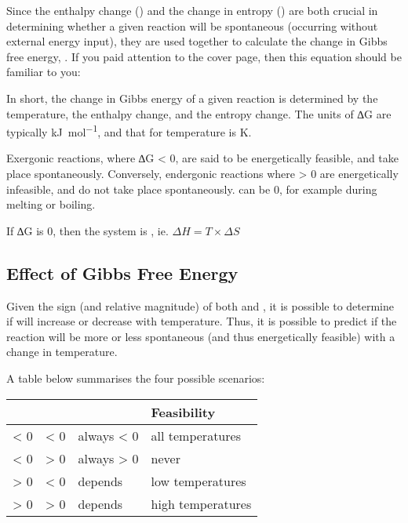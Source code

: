 		Since the enthalpy change (\enth{}) and the change in entropy (\entr{}) are both crucial in determining whether a given reaction will
		be spontaneous (occurring without external energy input), they are used together to calculate the change in Gibbs free energy, \gibb{}.
		If you paid attention to the cover page, then this equation should be familiar to you:

		\eqndiagram{
			\[ \Delta G = \Delta H - T\times \Delta S \]
		}

		In short, the change in Gibbs energy of a given reaction is determined by the temperature, the enthalpy change, and the entropy change.
		The units of ∆G are typically \si{\kilo\joule\per\mole}, and that for temperature is \si{\kelvin}.

		Exergonic reactions, where ∆G < 0, are said to be energetically feasible, and take place spontaneously. Conversely, endergonic
		reactions where \gibb{} > 0 are energetically infeasible, and do not take place spontaneously. \gibb{} can be 0, for example during
		melting or boiling.

		If ∆G is 0, then the system is , ie. $\Delta H = T\times \Delta S$

		\subsection{Effect of Gibbs Free Energy}

			Given the sign (and relative magnitude) of both \enth{} and \entr{}, it is possible to determine if \gibb{} will increase or
			decrease with temperature. Thus, it is possible to predict if the reaction will be more or less spontaneous (and thus
			energetically feasible) with a change in temperature.

			A table below summarises the four possible scenarios:

			\begin{center}\begin{table}[htb]\renewcommand{\arraystretch}{1.5}
			\begin{tabu} to \textwidth {| X[c,m] | X[c,m] | X[c,m] | X[c,m] |}

				\hline		\enth{}		&	\entr{}		&	\gibb{}		&		Feasibility			\\

				\hline		< 0			&	< 0			&	always < 0	&		all temperatures	\\
				\hline		< 0			&	> 0			&	always > 0	&				never		\\
				\hline		> 0			&	< 0			&	depends		&		low temperatures	\\
				\hline		> 0			&	> 0			&	depends		&		high temperatures	\\
				\hline

			\end{tabu}
			\end{table}\end{center}\vspace{-10mm}

